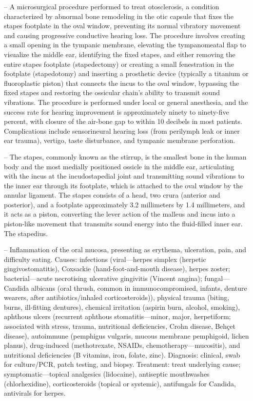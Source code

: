 -- A microsurgical procedure performed to treat otosclerosis, a condition characterized by abnormal bone remodeling in the otic capsule that fixes the stapes footplate in the oval window, preventing its normal vibratory movement and causing progressive conductive hearing loss. The procedure involves creating a small opening in the tympanic membrane, elevating the tympanomeatal flap to visualize the middle ear, identifying the fixed stapes, and either removing the entire stapes footplate (stapedectomy) or creating a small fenestration in the footplate (stapedotomy) and inserting a prosthetic device (typically a titanium or fluoroplastic piston) that connects the incus to the oval window, bypassing the fixed stapes and restoring the ossicular chain’s ability to transmit sound vibrations. The procedure is performed under local or general anesthesia, and the success rate for hearing improvement is approximately ninety to ninety-five percent, with closure of the air-bone gap to within 10 decibels in most patients. Complications include sensorineural hearing loss (from perilymph leak or inner ear trauma), vertigo, taste disturbance, and tympanic membrane perforation.

-- The stapes, commonly known as the stirrup, is the smallest bone in the human body and the most medially positioned ossicle in the middle ear, articulating with the incus at the incudostapedial joint and transmitting sound vibrations to the inner ear through its footplate, which is attached to the oval window by the annular ligament. The stapes consists of a head, two crura (anterior and posterior), and a footplate approximately 3.2 millimeters by 1.4 millimeters, and it acts as a piston, converting the lever action of the malleus and incus into a piston-like movement that transmits sound energy into the fluid-filled inner ear. The stapedius.

-- Inflammation of the oral mucosa, presenting as erythema, ulceration, pain, and difficulty eating. Causes: infections (viral—herpes simplex (herpetic gingivostomatitis), Coxsackie (hand-foot-and-mouth disease), herpes zoster; bacterial—acute necrotising ulcerative gingivitis (Vincent angina); fungal—Candida albicans (oral thrush, common in immunocompromised, infants, denture wearers, after antibiotics/inhaled corticosteroids)), physical trauma (biting, burns, ill-fitting dentures), chemical irritation (aspirin burn, alcohol, smoking), aphthous ulcers (recurrent aphthous stomatitis—minor, major, herpetiform; associated with stress, trauma, nutritional deficiencies, Crohn disease, Behçet disease), autoimmune (pemphigus vulgaris, mucous membrane pemphigoid, lichen planus), drug-induced (methotrexate, NSAIDs, chemotherapy—mucositis), and nutritional deficiencies (B vitamins, iron, folate, zinc). Diagnosis: clinical, swab for culture/PCR, patch testing, and biopsy. Treatment: treat underlying cause; symptomatic—topical analgesics (lidocaine), antiseptic mouthwashes (chlorhexidine), corticosteroids (topical or systemic), antifungals for Candida, antivirals for herpes.

